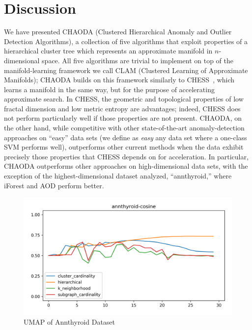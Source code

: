 \section{Discussion}
\label{sec:conclusions}

We have presented CHAODA (Clustered Hierarchical Anomaly and Outlier Detection Algorithms), a collection of five algorithms that exploit properties of a hierarchical cluster tree which represents an approximate manifold in $n$-dimensional space.
All five algorithms are trivial to implement on top of the manifold-learning framework we call CLAM (Clustered Learning of Approximate Manifolds); CHAODA builds on this framework similarly to CHESS~\cite{ishaq2019entropy}, which learns a manifold in the same way, but for the purpose of accelerating approximate search.
In CHESS, the geometric and topological properties of low fractal dimension and low metric entropy are advantages; indeed, CHESS does not perform particularly well if those properties are not present.
CHAODA, on the other hand, while competitive with other state-of-the-art anomaly-detection approaches on ``easy'' data sets (we define as \textit{easy} any data set where a one-class SVM performs well), outperforms other current methods when the data exhibit precisely those properties that CHESS depends on for acceleration. In particular, CHAODA outperforms other approaches on high-dimensional data sets, with the exception of the highest-dimensional dataset analyzed, ``annthyroid,'' where iForest and AOD perform better.


\begin{figure}
    \centering
    \includegraphics{kdd/static/auc_vs_depth/annthyroid-cosine.png}
    \caption{UMAP of Annthyroid Dataset}
    \label{fig:annthyroid-umap}
\end{figure}

